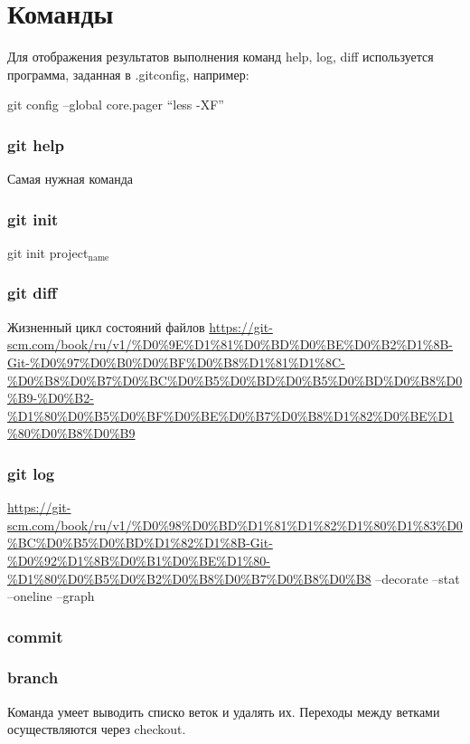 \section{Команды}
\label{sec-3}

Для отображения результатов выполнения команд help, log, diff
используется программа, заданная в .gitconfig, например: 

git config --global core.pager ``less -XF''
\begin{frame}
\frametitle{git help}
\label{sec-3-1}

Самая нужная команда 
\end{frame}
\begin{frame}
\frametitle{git init}
\label{sec-3-2}

git init project$_{\mathrm{name}}$
\end{frame}
\begin{frame}
\frametitle{git diff}
\label{sec-3-3}

Жизненный цикл состояний файлов
\href{https://git-scm.com/book/ru/v1/%D0%9E%D1%81%D0%BD%D0%BE%D0%B2%D1%8B-Git-%D0%97%D0%B0%D0%BF%D0%B8%D1%81%D1%8C-%D0%B8%D0%B7%D0%BC%D0%B5%D0%BD%D0%B5%D0%BD%D0%B8%D0%B9-%D0%B2-%D1%80%D0%B5%D0%BF%D0%BE%D0%B7%D0%B8%D1%82%D0%BE%D1%80%D0%B8%D0%B9}{https://git-scm.com/book/ru/v1/\%D0\%9E\%D1\%81\%D0\%BD\%D0\%BE\%D0\%B2\%D1\%8B-Git-\%D0\%97\%D0\%B0\%D0\%BF\%D0\%B8\%D1\%81\%D1\%8C-\%D0\%B8\%D0\%B7\%D0\%BC\%D0\%B5\%D0\%BD\%D0\%B5\%D0\%BD\%D0\%B8\%D0\%B9-\%D0\%B2-\%D1\%80\%D0\%B5\%D0\%BF\%D0\%BE\%D0\%B7\%D0\%B8\%D1\%82\%D0\%BE\%D1\%80\%D0\%B8\%D0\%B9}
\end{frame}
\begin{frame}
\frametitle{git log}
\label{sec-3-4}

\href{https://git-scm.com/book/ru/v1/%D0%98%D0%BD%D1%81%D1%82%D1%80%D1%83%D0%BC%D0%B5%D0%BD%D1%82%D1%8B-Git-%D0%92%D1%8B%D0%B1%D0%BE%D1%80-%D1%80%D0%B5%D0%B2%D0%B8%D0%B7%D0%B8%D0%B8}{https://git-scm.com/book/ru/v1/\%D0\%98\%D0\%BD\%D1\%81\%D1\%82\%D1\%80\%D1\%83\%D0\%BC\%D0\%B5\%D0\%BD\%D1\%82\%D1\%8B-Git-\%D0\%92\%D1\%8B\%D0\%B1\%D0\%BE\%D1\%80-\%D1\%80\%D0\%B5\%D0\%B2\%D0\%B8\%D0\%B7\%D0\%B8\%D0\%B8}
--decorate
--stat
--oneline
--graph
\end{frame}
\begin{frame}
\frametitle{commit}
\label{sec-3-5}
\end{frame}
\begin{frame}
\frametitle{branch}
\label{sec-3-6}

Команда умеет выводить списко веток и удалять их.
Переходы между ветками осуществляются через checkout.
\end{frame}
